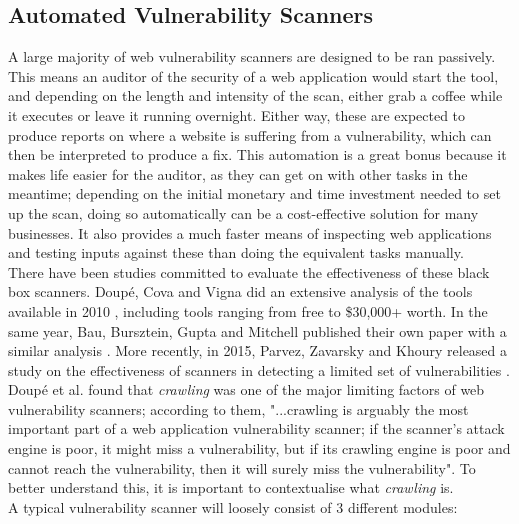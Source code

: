 \subsection{Automated Vulnerability Scanners}
 
A large majority of web vulnerability scanners are designed to be ran passively. This means an auditor of the security of a web application would start the tool, and depending on the length and intensity of the scan, either grab a coffee while it executes or leave it running overnight. Either way, these are expected to produce reports on where a website is suffering from a vulnerability, which can then be interpreted to produce a fix. This automation is a great bonus because it makes life easier for the auditor, as they can get on with other tasks in the meantime; depending on the initial monetary and time investment needed to set up the scan, doing so automatically can be a cost-effective solution for many businesses. It also provides a much faster means of inspecting web applications and testing inputs against these than doing the equivalent tasks manually. \\

There have been studies committed to evaluate the effectiveness of these black box scanners. Doup\'e, Cova and Vigna did an extensive analysis of the tools available in 2010 \cite{whyJohnnyCantPentest}, including tools ranging from free to \$30,000+ worth. In the same year, Bau, Bursztein, Gupta and Mitchell published their own paper with a similar analysis \cite{stateOfArtAutomatedBlackBoxWebAppVulnTesting}. More recently, in 2015, Parvez, Zavarsky and Khoury released a study on the effectiveness of scanners in detecting a limited set of vulnerabilities \cite{analysisOfEffectivenessOfBlackBoxWebAppScannersStoredSQLStoredXSS}. \\

Doup\'e et al. found that \textit{crawling} was one of the major limiting factors of web vulnerability scanners; according to them, {"...crawling is arguably the most important part of a web application vulnerability scanner; if the scanner’s attack engine is poor, it might miss a vulnerability, but if its crawling engine is poor and cannot reach the vulnerability, then it will surely miss the vulnerability"}. To better understand this, it is important to contextualise what \textit{crawling} is. \\

A typical vulnerability scanner will loosely consist of 3 different modules:

